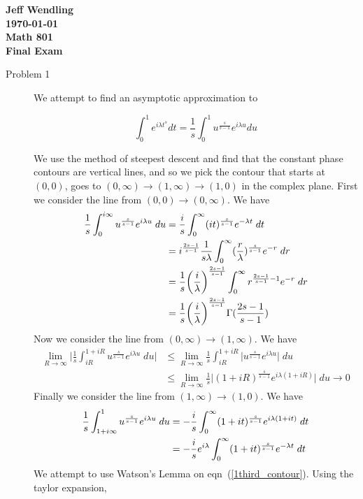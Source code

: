 \documentclass[11pt]{article}
\newcommand{\eq}[1]{\begin{align*}#1\end{align*}}
\newcommand{\eqn}[2]{
  \begin{equation}
    \label{#1}
    #2
  \end{equation}
}
\newcommand{\lam}{\lambda}
\newcommand{\eqr}[1]{eqn~(\ref{#1})}
\begin{document}
\begin{center}
{\large\bf 
Jeff Wendling\\
\today\\
Math 801\\
Final Exam
}
\end{center}
\begin{description}
\item[Problem 1]
We attempt to find an asymptotic approximation to
\eqn{1eqn}{
  \int_0^1 e^{i\lam t^s} dt = \frac{1}{s} \int_0^1 u^\frac{s}{s-1} e^{i\lam u} du
}
We use the method of steepest descent and find that the constant phase contours are
vertical lines, and so we pick the contour that starts at $(0,0)$, goes to $(0, \infty) \rightarrow (1,\infty) \rightarrow (1,0)$ in the complex plane.
First we consider the line from $(0,0) \rightarrow (0,\infty)$. We have
\begin{align}
\notag
  \frac{1}{s} \int_0^{i \infty} u^\frac{s}{s-1} e^{i\lam u} \; du
  &=
  \frac{i}{s} \int_0^\infty (it)^\frac{s}{s-1} e^{-\lam t} \; dt
  \\
\notag
  &= 
  i^\frac{2s-1}{s-1}
  \frac{1}{s\lam}
  \int_0^\infty
  (\frac{r}{\lam})^\frac{s}{s-1} e^{-r}
  \; dr
  \\
\notag
  &=
  \frac{1}{s}
  \bigg(\frac{i}{\lam}\bigg)^\frac{2s-1}{s-1}
  \int_0^\infty
  r^{\frac{2s-1}{s-1} - 1} e^{-r}
  \; dr
  \\
  \label{1first_approx}
  &=
  \frac{1}{s}
  \bigg(\frac{i}{\lam}\bigg)^\frac{2s-1}{s-1}
  \Gamma(
    \frac{2s-1}{s-1}
  )
\end{align}
Now we consider the line from $(0,\infty) \rightarrow (1,\infty)$. We have
\eq{
  \lim_{R\rightarrow \infty} \bigg|\frac{1}{s} \int_{iR}^{1+iR} u^\frac{s}{s-1} e^{i\lam u} \; du \bigg|
  &\leq
  \lim_{R\rightarrow \infty} \frac{1}{s} \int_{iR}^{1+iR}\bigg|u^\frac{s}{s-1} e^{i\lam u}\bigg| \; du \\
  &\leq
  \lim_{R\rightarrow \infty} \frac{1}{s} \bigg|(1+iR)^\frac{s}{s-1} e^{i\lam (1+iR)}\bigg| \; du \rightarrow 0
}
Finally we consider the line from $(1,\infty) \rightarrow (1,0)$. We have
\begin{align}
  \notag
  \frac{1}{s} \int_{1+i\infty}^{1} u^\frac{s}{s-1} e^{i\lam u} \; du
  &=
  -\frac{i}{s} \int_0^\infty (1+it)^\frac{s}{s-1} e^{i\lam (1+it)} \; dt
  \\
  \label{1third_contour}
  &=
  -\frac{i}{s}
  e^{i\lam}
  \int_0^\infty (1+it)^\frac{s}{s-1} e^{-\lam t} \; dt
\end{align}
We attempt to use Watson's Lemma on \eqr{1third_contour}. Using the taylor expansion,

\end{description}
\end{document}
